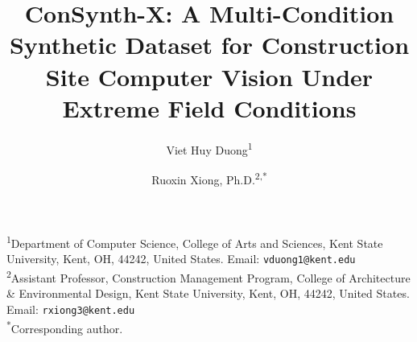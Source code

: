 \documentclass[12pt]{article}
\begin{document}
\title{ConSynth-X: A Multi-Condition Synthetic Dataset for Construction Site Computer Vision Under Extreme Field Conditions}

\author{
    Viet Huy Duong\textsuperscript{1}
    \and
    Ruoxin Xiong, Ph.D.\textsuperscript{2,*}
}

\date{}
\maketitle

\noindent
\textsuperscript{1}Department of Computer Science, College of Arts and Sciences, Kent State University, Kent, OH, 44242, United States. Email: \texttt{vduong1@kent.edu}\\[0.3em]
\textsuperscript{2}Assistant Professor, Construction Management Program, College of Architecture \& Environmental Design, Kent State University, Kent, OH, 44242, United States. Email: \texttt{rxiong3@kent.edu}\\[0.3em]
\textsuperscript{*}Corresponding author.
\end{document}
